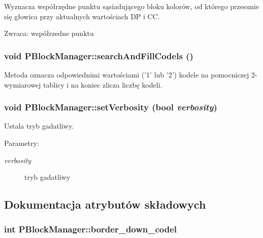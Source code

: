 Wyznacza współrzędne punktu sąsiadującego bloku kolorów, od którego przesunie się głowica przy aktualnych wartościach DP i CC. \begin{Desc}
\item[Zwraca:]współrzedne punktu \end{Desc}
\hypertarget{classPBlockManager_88f9f5226179e0fbd9d148001de10e97}{
\subsubsection[{searchAndFillCodels}]{\setlength{\rightskip}{0pt plus 5cm}void PBlockManager::searchAndFillCodels ()}}
\label{classPBlockManager_88f9f5226179e0fbd9d148001de10e97}


Metoda oznacza odpowiednimi wartościami ('1' lub '2') kodele na pomocniczej 2-wymiarowej tablicy i na koniec zlicza liczbę kodeli. \hypertarget{classPBlockManager_926e182e360300d6524fbb01fb90866b}{
\subsubsection[{setVerbosity}]{\setlength{\rightskip}{0pt plus 5cm}void PBlockManager::setVerbosity (bool {\em verbosity})}}
\label{classPBlockManager_926e182e360300d6524fbb01fb90866b}


Ustala tryb gadatliwy. \begin{Desc}
\item[Parametry:]
\begin{description}
\item[{\em verbosity}]tryb gadatliwy \end{description}
\end{Desc}


\subsection{Dokumentacja atrybutów składowych}
\hypertarget{classPBlockManager_9a2e17b1fa59c0b083e760a385b3565f}{
\subsubsection[{border\_\-down\_\-codel}]{\setlength{\rightskip}{0pt plus 5cm}int {\bf PBlockManager::border\_\-down\_\-codel}}}
\label{classPBlockManager_9a2e17b1fa59c0b083e760a385b3565f}



